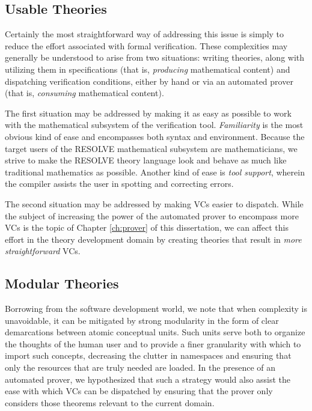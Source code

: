 	\subsection{Usable Theories\label{usableTheories}}

Certainly the most straightforward way of addressing this issue is simply to reduce the effort associated with formal verification.  These complexities may generally be understood to arise from two situations: writing theories, along with utilizing them in specifications (that is, \emph{producing} mathematical content) and dispatching verification conditions, either by hand or via an automated prover (that is, \emph{consuming} mathematical content).

The first situation may be addressed by making it as easy as possible to work with the mathematical subsystem of the verification tool.  \emph{Familiarity} is the most obvious kind of ease and encompasses both syntax and environment.  Because the target users of the RESOLVE mathematical subsystem are mathematicians, we strive to make the RESOLVE theory language look and behave as much like traditional mathematics as possible.  Another kind of ease is \emph{tool support}, wherein the compiler assists the user in spotting and correcting errors.

The second situation may be addressed by making VCs easier to dispatch.  While the subject of increasing the power of the automated prover to encompass more VCs is the topic of Chapter \ref{ch:prover} of this dissertation, we can affect this effort in the theory development domain by creating theories that result in \emph{more straightforward} VCs.

	\subsection{Modular Theories\label{modularTheories}}

Borrowing from the software development world, we note that when complexity is unavoidable, it can be mitigated by strong modularity in the form of clear demarcations between atomic conceptual units.   Such units serve both to organize the thoughts of the human user and to provide a finer granularity with which to import such concepts, decreasing the clutter in namespaces and ensuring that only the resources that are truly needed are loaded.  In the presence of an automated prover, we hypothesized that such a strategy would also assist the ease with which VCs can be dispatched by ensuring that the prover only considers those theorems relevant to the current domain.

